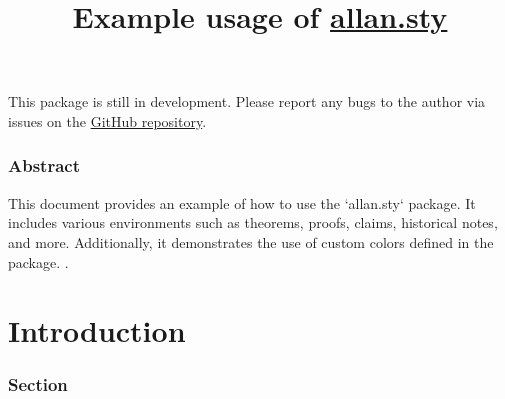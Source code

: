 \documentclass[12pt]{extarticle}
\title{\textbf{\color{allandarkblue}Example usage of \url{allan.sty}}}
\begin{document}
    \maketitle
    \tableofcontents
    \begin{mdframed}[style=allancadetbluebox, frametitle={Warning}]
        This package is still in development. Please report any bugs to the author via issues on the \href{https://github.com/MathxStudio/LaTeX_template}{GitHub repository}.
    \end{mdframed}

    \newpage
    \section*{Abstract}
    This document provides an example of how to use the `allan.sty` package. It includes various environments such as theorems, proofs, claims, historical notes, and more. Additionally, it demonstrates the use of custom colors defined in the package.
.
    \listoftheorems[ignoreall,show={theorem,lemma,claim}]

    \part{Introduction}
    \section{Section}
\end{document}
